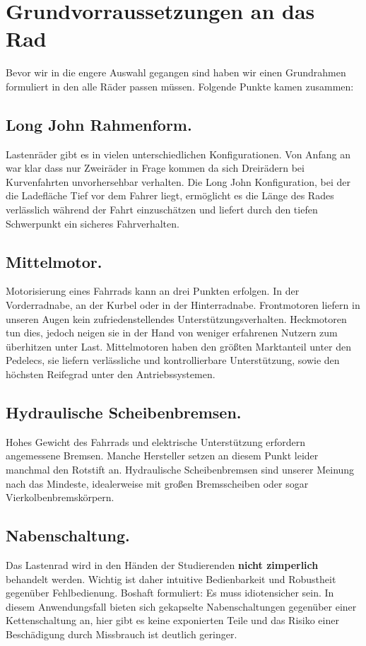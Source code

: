 \documentclass[a4paper,ngerman, 14pt] {scrartcl}
\begin{document}
\section{Grundvorraussetzungen an das Rad}
Bevor wir in die engere Auswahl gegangen sind haben wir einen Grundrahmen formuliert in den alle Räder passen müssen. Folgende Punkte kamen zusammen:\\
\subsection{Long John Rahmenform.} Lastenräder gibt es in vielen unterschiedlichen Konfigurationen. Von Anfang an war klar dass nur Zweiräder in Frage kommen da sich Dreirädern bei Kurvenfahrten unvorhersehbar verhalten. Die Long John Konfiguration, bei der die Ladefläche Tief vor dem Fahrer liegt, ermöglicht es die Länge des Rades verlässlich während der Fahrt einzuschätzen und liefert durch den tiefen Schwerpunkt ein sicheres Fahrverhalten.

\subsection{Mittelmotor.} Motorisierung eines Fahrrads kann an drei Punkten erfolgen. In der Vorderradnabe, an der Kurbel oder in der Hinterradnabe. Frontmotoren liefern in unseren Augen kein zufriedenstellendes Unterstützungsverhalten. Heckmotoren tun dies, jedoch neigen sie in der Hand von weniger erfahrenen Nutzern zum überhitzen unter Last. Mittelmotoren haben den größten Marktanteil unter den Pedelecs, sie liefern verlässliche und kontrollierbare Unterstützung, sowie den höchsten Reifegrad unter den Antriebssystemen.

\subsection{Hydraulische Scheibenbremsen.} Hohes Gewicht des Fahrrads und elektrische Unterstützung erfordern angemessene Bremsen. Manche Hersteller setzen an diesem Punkt leider manchmal den Rotstift an. Hydraulische Scheibenbremsen sind unserer Meinung nach das Mindeste, idealerweise mit großen Bremsscheiben oder sogar Vierkolbenbremskörpern.

\subsection{Nabenschaltung.} Das Lastenrad wird in den Händen der Studierenden \textbf{nicht zimperlich} behandelt werden. Wichtig ist daher intuitive Bedienbarkeit und Robustheit gegenüber Fehlbedienung. Boshaft formuliert: Es muss idiotensicher sein. In diesem Anwendungsfall bieten sich gekapselte Nabenschaltungen gegenüber einer Kettenschaltung an, hier gibt es keine exponierten Teile und das Risiko einer Beschädigung durch Missbrauch ist deutlich geringer.
\end{document}
